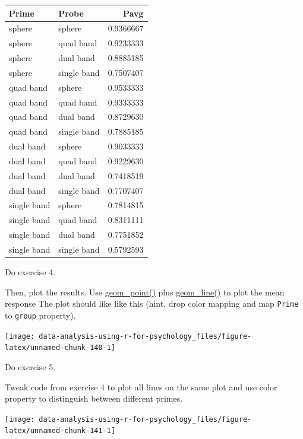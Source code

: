 \documentclass[
]{book}
\begin{document}
\begin{tabular}{l|l|r}
\hline
Prime & Probe & Pavg\\
\hline
sphere & sphere & 0.9366667\\
\hline
sphere & quad band & 0.9233333\\
\hline
sphere & dual band & 0.8885185\\
\hline
sphere & single band & 0.7507407\\
\hline
quad band & sphere & 0.9533333\\
\hline
quad band & quad band & 0.9333333\\
\hline
quad band & dual band & 0.8729630\\
\hline
quad band & single band & 0.7885185\\
\hline
dual band & sphere & 0.9033333\\
\hline
dual band & quad band & 0.9229630\\
\hline
dual band & dual band & 0.7418519\\
\hline
dual band & single band & 0.7707407\\
\hline
single band & sphere & 0.7814815\\
\hline
single band & quad band & 0.8311111\\
\hline
single band & dual band & 0.7751852\\
\hline
single band & single band & 0.5792593\\
\hline
\end{tabular}

Do exercise 4.

Then, plot the results. Use \href{https://ggplot2.tidyverse.org/reference/geom_point.html}{geom\_point()} plus \href{https://ggplot2.tidyverse.org/reference/geom_path.html}{geom\_line()} to plot the mean response The plot should like like this (hint, drop color mapping and map \texttt{Prime} to \texttt{group} property).

\begin{center}\texttt{[image: data-analysis-using-r-for-psychology\_files/figure-latex/unnamed-chunk-140-1]} \end{center}

Do exercise 5.

Tweak code from exercise 4 to plot all lines on the same plot and use color property to distinguish between different primes.

\begin{center}\texttt{[image: data-analysis-using-r-for-psychology\_files/figure-latex/unnamed-chunk-141-1]} \end{center}
\end{document}
